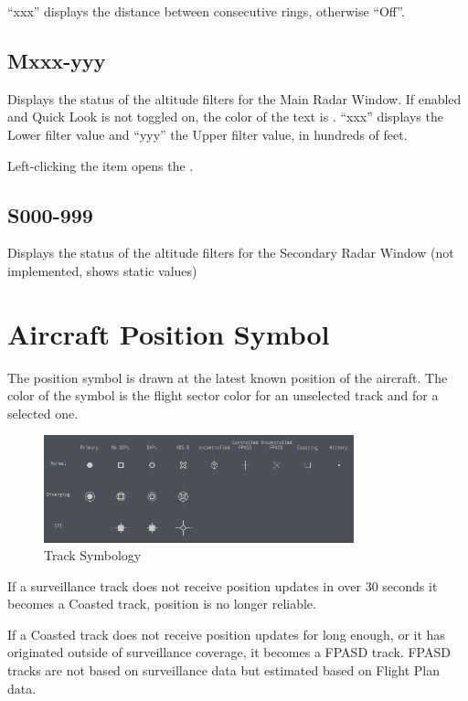 \documentclass[a4paper,oneside,11pt]{memoir}
\begin{document}
\bigskip

“xxx” displays the distance between consecutive rings, otherwise “Off”.

\subsection{Mxxx-yyy}
\label{menu:mfil}

Displays the status of the altitude filters for the Main Radar Window. If enabled and Quick Look is not toggled on, the color of the text is . “xxx” displays the Lower filter value and “yyy” the Upper filter value, in hundreds of feet.

\bigskip

Left-clicking the item opens the .

\subsection{S000-999}

Displays the status of the altitude filters for the Secondary Radar Window (not implemented, shows static values)

\section{Aircraft Position Symbol}

The position symbol is drawn at the latest known position of the aircraft. The color of the symbol is the flight sector color for an unselected track and  for a selected one.

\begin{figure}[H]
  \centering
  \includegraphics[max height=0.80\textheight,max width=0.80\textwidth]{img/tracks.png}
  \caption{Track Symbology}
\end{figure}

If a surveillance track does not receive position updates in over 30 seconds it becomes a Coasted track, position is no longer reliable.

If a Coasted track does not receive position updates for long enough, or it has originated outside of surveillance coverage, it becomes a FPASD track. FPASD tracks are not based on surveillance data but estimated based on Flight Plan data.
\end{document}
